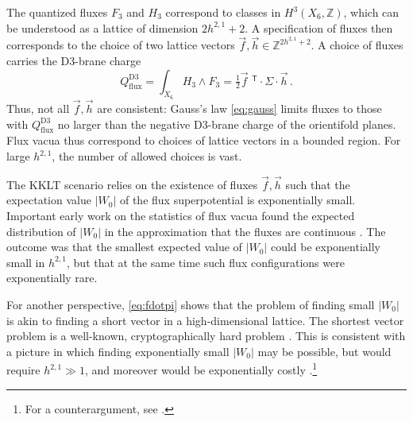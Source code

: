 \documentclass[12pt,a4wide]{article}
\begin{document}
The quantized fluxes $F_3$ and $H_3$ correspond to classes in $H^3(X_6,\mathbb{Z})$, which can be understood as a lattice of dimension $2h^{2,1}+2$.  A specification of fluxes then corresponds to the choice of two lattice vectors $\vec{f}, \vec{h} \in \mathbb{Z}^{2h^{2,1}+2}$.  A choice of fluxes carries the D3-brane charge   
\begin{equation}
    Q^{\text{D3}}_{\text{flux}} = \int_{X_6} H_3 \wedge F_3  =\tfrac{1}{2}{\vec{f}}\,\,^{\mathsf{T}}{\cdot} \Sigma{\cdot} \vec{h}\,. 
\end{equation}
Thus, not all $\vec{f}, \vec{h}$ are consistent: Gauss's law \eqref{eq:gauss} limits fluxes to those with $Q^{\text{D3}}_{\text{flux}}$ no larger than the negative D3-brane charge of the orientifold planes.  Flux vacua thus correspond to choices of lattice vectors in a bounded region.  For large $h^{2,1}$, the number of allowed choices is vast.

The KKLT scenario relies on the existence of fluxes $\vec{f}, \vec{h}$ such that the expectation value $|W_0|$ of the flux superpotential
is exponentially small.  
Important early work on the statistics of flux vacua found the expected distribution of $|W_0|$ in the approximation that the fluxes are continuous \cite{Denef:2004ze}.  The outcome was that the smallest expected value of $|W_0|$ could be exponentially small in $h^{2,1}$, but that at the same time such flux configurations were exponentially rare.

For another perspective, \eqref{eq:fdotpi} shows that the problem of finding small $|W_0|$ is akin to finding a short vector in a high-dimensional lattice.  The shortest vector problem is a well-known, cryptographically hard problem \cite{NPhard}.  This is consistent with a picture in which finding exponentially small $|W_0|$ may be possible, but would require $h^{2,1} \gg 1$, and moreover would be exponentially costly \cite{Denef:2006ad,Halverson:2018cio}.\footnote{For a counterargument, see \cite{Bao:2017thx}.}
\end{document}
